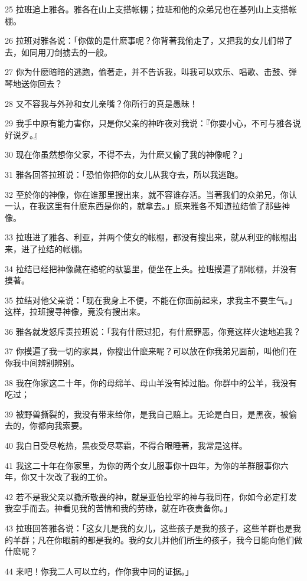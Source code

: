 \par 25 拉班追上雅各。雅各在山上支搭帐棚；拉班和他的众弟兄也在基列山上支搭帐棚。
\par 26 拉班对雅各说：「你做的是什麽事呢？你背著我偷走了，又把我的女儿们带了去，如同用刀剑掳去的一般。
\par 27 你为什麽暗暗的逃跑，偷著走，并不告诉我，叫我可以欢乐、唱歌、击鼓、弹琴地送你回去？
\par 28 又不容我与外孙和女儿亲嘴？你所行的真是愚昧！
\par 29 我手中原有能力害你，只是你父亲的神昨夜对我说：『你要小心，不可与雅各说好说歹。』
\par 30 现在你虽然想你父家，不得不去，为什麽又偷了我的神像呢？」
\par 31 雅各回答拉班说：「恐怕你把你的女儿从我夺去，所以我逃跑。
\par 32 至於你的神像，你在谁那里搜出来，就不容谁存活。当著我们的众弟兄，你认一认，在我这里有什麽东西是你的，就拿去。」原来雅各不知道拉结偷了那些神像。
\par 33 拉班进了雅各、利亚，并两个使女的帐棚，都没有搜出来，就从利亚的帐棚出来，进了拉结的帐棚。
\par 34 拉结已经把神像藏在骆驼的驮篓里，便坐在上头。拉班摸遍了那帐棚，并没有摸著。
\par 35 拉结对他父亲说：「现在我身上不便，不能在你面前起来，求我主不要生气。」这样，拉班搜寻神像，竟没有搜出来。
\par 36 雅各就发怒斥责拉班说：「我有什麽过犯，有什麽罪恶，你竟这样火速地追我？
\par 37 你摸遍了我一切的家具，你搜出什麽来呢？可以放在你我弟兄面前，叫他们在你我中间辨别辨别。
\par 38 我在你家这二十年，你的母绵羊、母山羊没有掉过胎。你群中的公羊，我没有吃过；
\par 39 被野兽撕裂的，我没有带来给你，是我自己赔上。无论是白日，是黑夜，被偷去的，你都向我索要。
\par 40 我白日受尽乾热，黑夜受尽寒霜，不得合眼睡著，我常是这样。
\par 41 我这二十年在你家里，为你的两个女儿服事你十四年，为你的羊群服事你六年，你又十次改了我的工价。
\par 42 若不是我父亲以撒所敬畏的神，就是亚伯拉罕的神与我同在，你如今必定打发我空手而去。神看见我的苦情和我的劳碌，就在昨夜责备你。」
\par 43 拉班回答雅各说：「这女儿是我的女儿，这些孩子是我的孩子，这些羊群也是我的羊群；凡在你眼前的都是我的。我的女儿并他们所生的孩子，我今日能向他们做什麽呢？
\par 44 来吧！你我二人可以立约，作你我中间的证据。」
